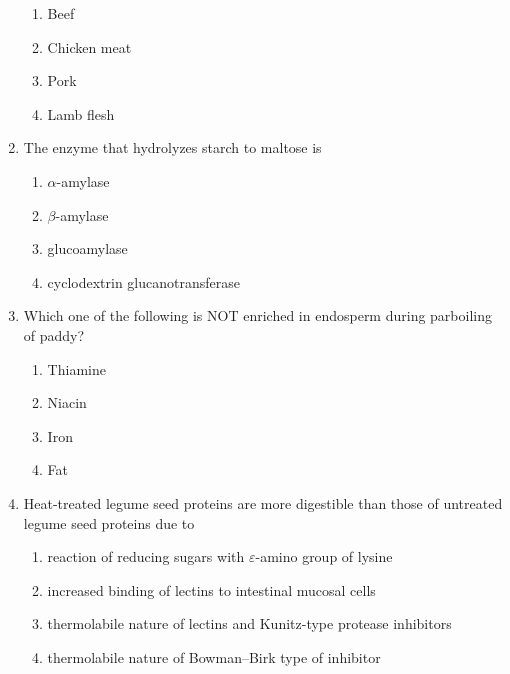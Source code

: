 \documentclass[journal,12pt,onecolumn]{IEEEtran}
\begin{document}
\begin{enumerate}[label=\arabic*)]
\vspace{0.2cm}
\begin{enumerate}[label=\alph*)]
\item Beef
\item Chicken meat
\item Pork
\item Lamb flesh
\end{enumerate}

\vspace{0.5cm}

\item The enzyme that hydrolyzes starch to maltose is
\hfill{} \\

\vspace{0.2cm}
\begin{enumerate}[label=\alph*)]
\item $\alpha$-amylase
\item $\beta$-amylase
\item glucoamylase
\item cyclodextrin glucanotransferase
\end{enumerate}

\vspace{0.5cm}

\item Which one of the following is NOT enriched in endosperm during parboiling of paddy?
\hfill{} \\

\vspace{0.2cm}
\begin{enumerate}[label=\alph*)]
\item Thiamine
\item Niacin
\item Iron
\item Fat
\end{enumerate}

\newpage

\item Heat-treated legume seed proteins are more digestible than those of untreated legume seed proteins due to
\hfill{} \\

\vspace{0.2cm}
\begin{enumerate}[label=\alph*)]
\item reaction of reducing sugars with $\varepsilon$-amino group of lysine
\item increased binding of lectins to intestinal mucosal cells
\item thermolabile nature of lectins and Kunitz-type protease inhibitors
\item thermolabile nature of Bowman–Birk type of inhibitor
\end{enumerate}


\end{enumerate}
\end{document}
